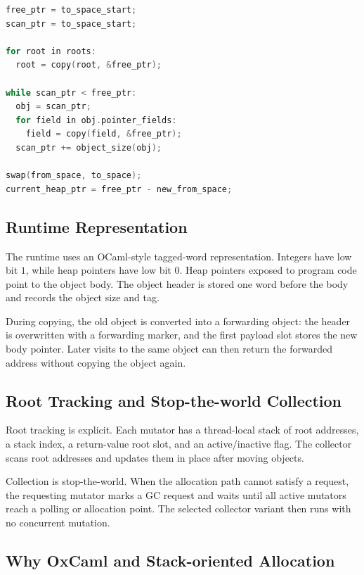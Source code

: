 \documentclass[11pt,a4paper]{article}
\begin{document}
\begin{lstlisting}[language=C,caption={High-level semi-space collection sketch.},label={lst:cheney}]
free_ptr = to_space_start;
scan_ptr = to_space_start;

for root in roots:
  root = copy(root, &free_ptr);

while scan_ptr < free_ptr:
  obj = scan_ptr;
  for field in obj.pointer_fields:
    field = copy(field, &free_ptr);
  scan_ptr += object_size(obj);

swap(from_space, to_space);
current_heap_ptr = free_ptr - new_from_space;
\end{lstlisting}

\subsection{Runtime Representation}

The runtime uses an OCaml-style tagged-word representation. Integers have low
bit \(1\), while heap pointers have low bit \(0\). Heap pointers exposed to
program code point to the object body. The object header is stored one word
before the body and records the object size and tag.

During copying, the old object is converted into a forwarding object: the header
is overwritten with a forwarding marker, and the first payload slot stores the
new body pointer. Later visits to the same object can then return the forwarded
address without copying the object again.

\subsection{Root Tracking and Stop-the-world Collection}

Root tracking is explicit. Each mutator has a thread-local stack of root
addresses, a stack index, a return-value root slot, and an active/inactive flag.
The collector scans root addresses and updates them in place after moving
objects.

Collection is stop-the-world. When the allocation path cannot satisfy a request,
the requesting mutator marks a GC request and waits until all active mutators
reach a polling or allocation point. The selected collector variant then runs
with no concurrent mutation.

\subsection{Why OxCaml and Stack-oriented Allocation}
\end{document}

